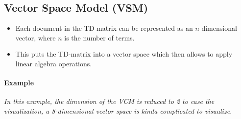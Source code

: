         \subsection{Vector Space Model (VSM)} %
            \begin{itemize}
            	\item Each document in the TD-matrix can be represented as an \(n\)-dimensional vector, where \(n\) is the number of terms.
            	\item This puts the TD-matrix into a vector space which then allows to apply linear algebra operations.
            \end{itemize}
        
        	\paragraph{Example}
        		\textit{In this example, the dimension of the VCM is reduced to 2 to ease the visualization, a 8-dimensional vector space is kinda complicated to visualize.}
        		
